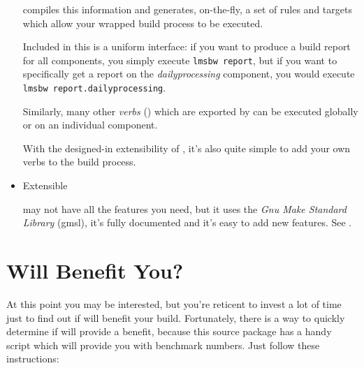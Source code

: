 \begin{itemize}
  \lmsbw compiles this information and generates, on-the-fly, a set of
  \make rules and targets which allow your wrapped build process to be
  executed.

  Included in this is a uniform interface: if you want to produce a
  build report for all components, you simply execute \texttt{lmsbw
    report}, but if you want to specifically get a report on the
  \emph{dailyprocessing} component, you would execute \texttt{lmsbw
    report.dailyprocessing}.

  Similarly, many other \emph{verbs} () which
  are exported by \lmsbw can be executed globally or on an individual
  component.

  With the designed-in extensibility of \lmsbw, it's also quite simple
  to add your own verbs to the build process.

\item Extensible

  \lmsbw may not have all the features you need, but it uses the
  \emph{Gnu Make Standard Library} (gmsl), it's fully documented and
  it's easy to add new features.  See .

\end{itemize}

\section{Will \lmsbw Benefit You?}

At this point you may be interested, but you're reticent to invest a
lot of time just to find out if \lmsbw will benefit your build.
Fortunately, there is a way to quickly determine if \lmsbw will
provide a benefit, because this source package has a handy script
which will provide you with benchmark numbers.  Just follow these
instructions:

